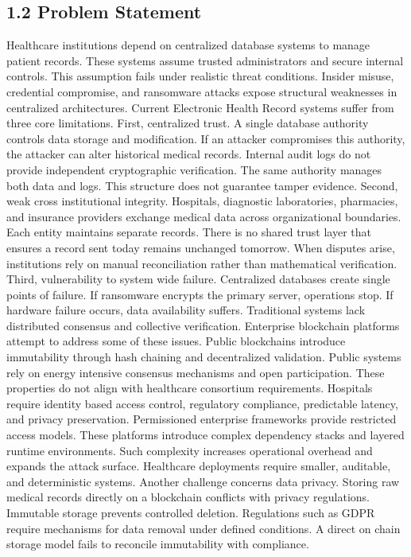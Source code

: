\subsection*{1.2 Problem Statement}
Healthcare institutions depend on centralized database systems to manage patient records. These systems assume trusted administrators and secure internal controls. This assumption fails under realistic threat conditions. Insider misuse, credential compromise, and ransomware attacks expose structural weaknesses in centralized architectures.
Current Electronic Health Record systems suffer from three core limitations.
First, centralized trust.
A single database authority controls data storage and modification. If an attacker compromises this authority, the attacker can alter historical medical records. Internal audit logs do not provide independent cryptographic verification. The same authority manages both data and logs. This structure does not guarantee tamper evidence.
Second, weak cross institutional integrity.
Hospitals, diagnostic laboratories, pharmacies, and insurance providers exchange medical data across organizational boundaries. Each entity maintains separate records. There is no shared trust layer that ensures a record sent today remains unchanged tomorrow. When disputes arise, institutions rely on manual reconciliation rather than mathematical verification.
Third, vulnerability to system wide failure.
Centralized databases create single points of failure. If ransomware encrypts the primary server, operations stop. If hardware failure occurs, data availability suffers. Traditional systems lack distributed consensus and collective verification.
Enterprise blockchain platforms attempt to address some of these issues. Public blockchains introduce immutability through hash chaining and decentralized validation. Public systems rely on energy intensive consensus mechanisms and open participation. These properties do not align with healthcare consortium requirements. Hospitals require identity based access control, regulatory compliance, predictable latency, and privacy preservation.
Permissioned enterprise frameworks provide restricted access models. These platforms introduce complex dependency stacks and layered runtime environments. Such complexity increases operational overhead and expands the attack surface. Healthcare deployments require smaller, auditable, and deterministic systems.
Another challenge concerns data privacy. Storing raw medical records directly on a blockchain conflicts with privacy regulations. Immutable storage prevents controlled deletion. Regulations such as GDPR require mechanisms for data removal under defined conditions. A direct on chain storage model fails to reconcile immutability with compliance.
